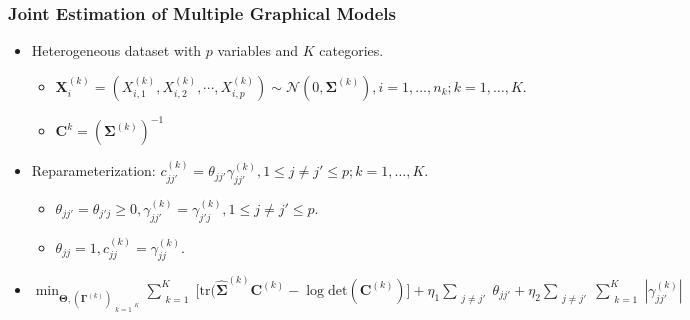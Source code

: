 \documentclass{beamer}
\newcommand{\boldSigma}{{\boldsymbol{\Sigma}}}
\newcommand{\boldGamma}{{\boldsymbol{\Gamma}}}
\newcommand{\boldTheta}{{\boldsymbol{\Theta}}}
\begin{document}
\begin{frame}

\frametitle{Joint Estimation of Multiple Graphical Models}

\begin{itemize}
\item Heterogeneous dataset with $p$ variables and $K$ categories.
    \begin{itemize}
    \item $\mathbf{X}_i^{(k)} = (X_{i,1}^{(k)}, X_{i,2}^{(k)}, \cdots, X_{i,p}^{(k)}) \sim \mathcal{N}(0, \boldSigma^{(k)}), i = 1, \dots, n_k; k = 1, \dots, K.$
    \item $\mathbf{C}^{k} = (\boldSigma^{(k)})^{-1}$
    \end{itemize} 
    
\item Reparameterization: $c_{j j'}^{(k)} = \theta_{j j'} \gamma_{j j'}^{(k)}, 1 \leq j \neq j' \leq p; k = 1, \dots, K$. 
    \begin{itemize}
    \item $\theta_{j j'} = \theta_{j' j} \geq 0, \gamma_{j j'}^{(k)}= \gamma_{j' j}^{(k)}, 1 \leq j \neq j' \leq p$.
    \item $\theta_{j j} = 1, c_{j j}^{(k)} = \gamma_{j j}^{(k)}$.
    \end{itemize}   
    
\item $\min_{\boldTheta, (\boldGamma^{(k)})_{\substack{k = 1}^K}} \sum_{\substack{ k = 1}}^K \Big[ \text{tr}(\hat{\boldSigma}^{(k)} \mathbf{C}^{(k)} - \log \text{det}(\mathbf{C}^{(k)}) \Big] + \eta_1 \sum_{\substack{j \neq j'}} \theta_{jj'} + \eta_2 \sum_{\substack{j \neq j'}} \sum_{\substack{k = 1}}^K |\gamma_{j j'}^{(k)}|$   
\end{itemize}

\end{frame}


\end{document}
